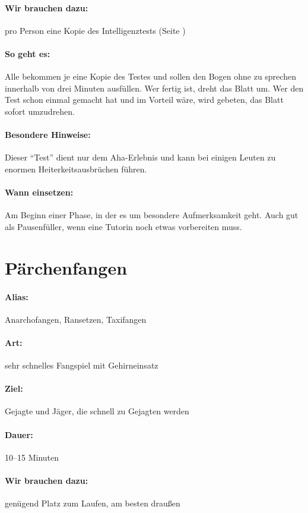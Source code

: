 \paragraph{Wir brauchen dazu:} pro Person eine Kopie des Intelligenztests (Seite \pageref{iq})
\paragraph{So geht es:} Alle bekommen je eine Kopie des Testes und sollen den Bogen ohne zu sprechen innerhalb von drei Minuten ausfüllen. Wer fertig ist, dreht das Blatt um. Wer den Test schon einmal gemacht hat und im Vorteil wäre, wird gebeten, das Blatt sofort umzudrehen.
\paragraph{Besondere Hinweise:} Dieser "`Test"' dient nur dem Aha-Erlebnis und kann bei einigen Leuten zu enormen Heiterkeitsausbrüchen führen.
\paragraph{Wann einsetzen:} Am Beginn einer Phase, in der es um besondere Aufmerksamkeit geht. Auch gut als Pausenfüller, wenn eine Tutorin noch etwas vorbereiten muss.

\section{Pärchenfangen}
\paragraph{Alias:} Anarchofangen, Ransetzen, Taxifangen
\paragraph{Art:} sehr schnelles Fangspiel mit Gehirneinsatz
\paragraph{Ziel:} Gejagte und Jäger, die schnell zu Gejagten werden
\paragraph{Dauer:} 10--15 Minuten
\paragraph{Wir brauchen dazu:} genügend Platz zum Laufen, am besten draußen
